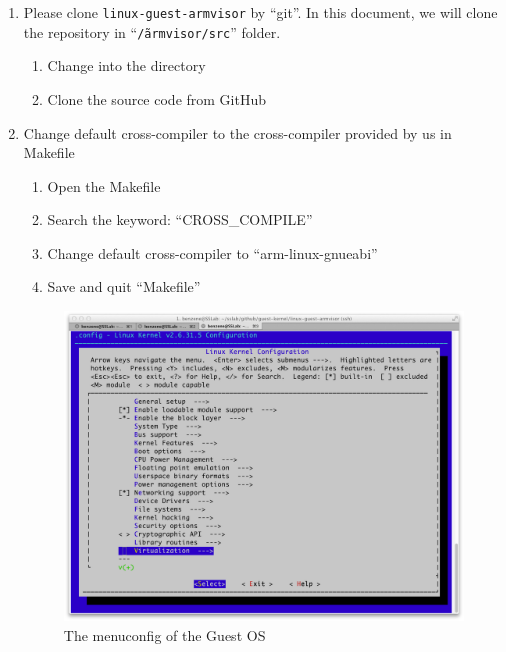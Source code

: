 \documentclass[12pt]{article}  %
\begin{document}
\begin{enumerate}
\item Please clone \texttt{linux-guest-armvisor} by ``git''. In this document, we will clone the repository in ``\texttt{\~/armvisor/src}'' folder.
\begin{enumerate}
\item Change into the directory\newline
{}

\item Clone the source code from GitHub\newline
{}

\end{enumerate}

\item Change default cross-compiler to the cross-compiler provided by us in Makefile
\begin{enumerate}

\item Open the Makefile



\item Search the keyword: ``CROSS\_COMPILE''

\item Change default cross-compiler to ``arm-linux-gnueabi''


\item Save and quit ``Makefile''

\end{enumerate}

\begin{figure}[h]  %
\includegraphics[scale=0.36]{guest_menuconfig.png}
\caption{The menuconfig of the Guest OS} 
\label{host_menuconfig}
\end{figure}
\newpage


\end{enumerate}
\end{document}
